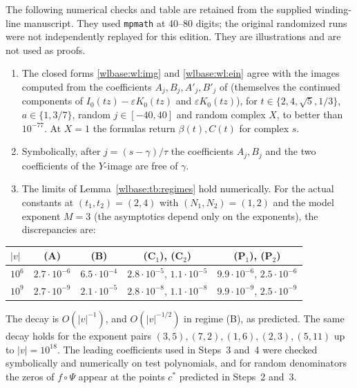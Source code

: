 \documentclass[11pt,a4paper]{article}
\theoremstyle{definition}\newtheorem{definition}[theorem]{Definition}
\theoremstyle{remark}\newtheorem{remark}[theorem]{Remark}
\begin{document}
The following numerical checks and table are retained from the supplied
winding-line manuscript. They used \texttt{mpmath} at 40--80 digits;
the original randomized runs were not independently replayed for this
edition. They are illustrations and are not used as proofs.
\begin{enumerate}
\item The closed forms \eqref{wlbase:wl:img} and \eqref{wlbase:wl:ein} agree with the images
computed from the coefficients $A_j,B_j,A'_j,B'_j$ of \cite[\S mbc]{EB}
(themselves the continued components of $I_0(tz)-\varepsilon K_0(tz)$ and
$\varepsilon K_0(tz)$), for $t\in\{2,4,\sqrt5,1/3\}$, $a\in\{1,3/7\}$, random
$j\in[-40,40]$ and random complex $X$, to better than $10^{-77}$. At $X=1$ the
formulas return $\beta(t),C(t)$ for complex $s$.
\item Symbolically, after $j=(s-\gamma)/\tau$ the coefficients $A_j,B_j$ and
the two coefficients of the $Y$-image are free of $\gamma$.
\item The limits of Lemma~\ref{wlbase:tb:regimes} hold numerically. For the actual
constants at $(t_1,t_2)=(2,4)$ with $(N_1,N_2)=(1,2)$ and the model exponent
$M=3$ (the asymptotics depend only on the exponents), the discrepancies are:
\end{enumerate}
\begin{center}
\begin{tabular}{@{}lcccc@{}}
\toprule
$|v|$ & (A) & (B) & (C$_1$), (C$_2$) & (P$_1$), (P$_2$)\\
\midrule
$10^6$ & $2.7\cdot10^{-6}$ & $6.5\cdot10^{-4}$ & $2.8\cdot10^{-5}$, $1.1\cdot10^{-5}$ & $9.9\cdot10^{-6}$, $2.5\cdot10^{-6}$\\
$10^9$ & $2.7\cdot10^{-9}$ & $2.1\cdot10^{-5}$ & $2.8\cdot10^{-8}$, $1.1\cdot10^{-8}$ & $9.9\cdot10^{-9}$, $2.5\cdot10^{-9}$\\
\bottomrule
\end{tabular}
\end{center}
The decay is $O(|v|^{-1})$, and $O(|v|^{-1/2})$ in regime (B), as predicted.
The same decay holds for the exponent pairs $(3,5),(7,2),(1,6),(2,3),(5,11)$
up to $|v|=10^{18}$. The leading coefficients used in Steps~3 and~4 were
checked symbolically and numerically on test polynomials, and for random
denominators the zeros of $f\circ\Psi$ appear at the points $c^*$ predicted
in Steps~2 and~3.

\end{document}
